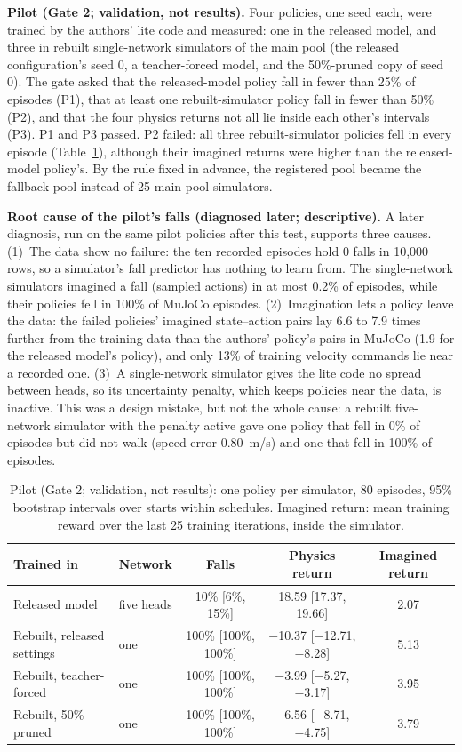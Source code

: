 \textbf{Pilot (Gate 2; validation, not results).} Four policies, one seed each, were trained by the authors' lite
code and measured: one in the released model, and three in rebuilt single-network simulators of the main pool (the
released configuration's seed 0, a teacher-forced model, and the 50\%-pruned copy of seed 0). The gate asked that the
released-model policy fall in fewer than 25\% of episodes (P1), that at least one rebuilt-simulator policy fall in
fewer than 50\% (P2), and that the four physics returns not all lie inside each other's intervals (P3). P1 and P3
passed. P2 failed: all three rebuilt-simulator policies fell in every episode (Table~\ref{tab:app-s2pilot}), although
their imagined returns were higher than the released-model policy's. By the rule fixed in advance, the registered pool
became the fallback pool instead of 25 main-pool simulators.

\textbf{Root cause of the pilot's falls (diagnosed later; descriptive).} A later diagnosis, run on the same pilot
policies after this test, supports three causes. (1)~The data show no failure: the ten recorded episodes hold
0 falls in 10{,}000 rows, so a simulator's fall predictor has nothing to learn from. The
single-network simulators imagined a fall (sampled actions) in at most 0.2\% of episodes, while their policies fell in
100\% of MuJoCo episodes. (2)~Imagination lets a policy leave the data: the failed policies' imagined
state--action pairs lay 6.6 to 7.9 times further from the training data than the authors' policy's
pairs in MuJoCo (1.9 for the released model's policy), and only 13\% of training velocity commands
lie near a recorded one. (3)~A single-network simulator gives the lite code no spread between heads, so its
uncertainty penalty, which keeps policies near the data, is inactive. This was a design mistake, but not the whole
cause: a rebuilt five-network simulator with the penalty active gave one policy that fell in 0\% of episodes
but did not walk (speed error 0.80~m/s) and one that fell in 100\% of episodes.

\begin{table}[h]
\centering
\caption{Pilot (Gate 2; validation, not results): one policy per simulator, 80 episodes, 95\% bootstrap
intervals over starts within schedules. Imagined return: mean training reward over the last 25 training iterations,
inside the simulator.}
\label{tab:app-s2pilot}
\footnotesize
\begin{tabular}{@{}llccc@{}}
\toprule
Trained in & Network & Falls & Physics return & Imagined return \\
\midrule
Released model & five heads & 10\% [6\%, 15\%] & 18.59 [17.37, 19.66] & 2.07 \\
Rebuilt, released settings & one & 100\% [100\%, 100\%] & $-$10.37 [$-$12.71, $-$8.28] & 5.13 \\
Rebuilt, teacher-forced & one & 100\% [100\%, 100\%] & $-$3.99 [$-$5.27, $-$3.17] & 3.95 \\
Rebuilt, 50\% pruned & one & 100\% [100\%, 100\%] & $-$6.56 [$-$8.71, $-$4.75] & 3.79 \\
\bottomrule
\end{tabular}
\end{table}

